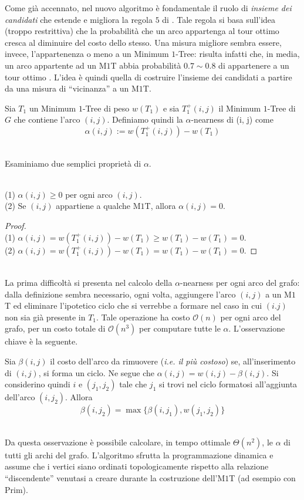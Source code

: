 Come già accennato, nel nuovo algoritmo è fondamentale il ruolo di \textit{insieme dei candidati} che 
estende e migliora la regola $5$ di \cite{LK}. Tale regola si basa sull'idea (troppo restrittiva) che la 
probabilità che un arco appartenga al tour ottimo cresca al diminuire del costo dello stesso. Una misura migliore 
sembra essere, invece, l'appartenenza o meno a un Minimum $1$-Tree: risulta infatti che, in media, un arco 
appartente ad un M$1$T abbia probabilità $0.7\sim0.8$ di appartenere a un tour ottimo \cite{LKH}. L'idea è quindi quella di 
costruire l'insieme dei candidati a partire da una misura di ``vicinanza'' a un M$1$T.

\begin{definition}
    Sia $T_1$ un Minimum $1$-Tree di peso $w(T_1)$ e sia $T_1^+(i, j)$ il Minimum $1$-Tree di $G$ che contiene 
    l'arco $(i, j)$. Definiamo quindi la $\alpha$-nearness di (i, j) come
    $$\alpha(i, j) := w(T_1^+(i,j)) - w(T_1)$$
\end{definition}
\ \\
Esaminiamo due semplici proprietà di $\alpha$.
\begin{theorem}\ \\
    (1) $\alpha(i,j) \geq 0$ per ogni arco $(i, j)$.\\
    (2) Se $(i, j)$ appartiene a qualche M$1$T, allora $\alpha(i,j)=0$.
\end{theorem}

\begin{proof}\ \\
    (1) $\alpha(i,j) = w(T_1^+(i,j))-w(T_1) \geq w(T_1)-w(T_1) = 0$.\\
    (2) $\alpha(i,j) = w(T_1^+(i,j))-w(T_1) = w(T_1)-w(T_1) = 0$.
\end{proof}
\ \\
La prima difficoltà si presenta nel calcolo della $\alpha$-nearness per ogni arco del grafo: dalla definizione 
sembra necessario, ogni volta, aggiungere l'arco $(i,j)$ a un M$1$T ed eliminare l'ipotetico ciclo che si 
verrebbe a formare nel caso in cui $(i.j)$ non sia già presente in $T_1$. Tale operazione ha costo $\mathcal{O}(n)$ 
per ogni arco del grafo, per un costo totale di $\mathcal{O}(n^3)$ per computare tutte le $\alpha$. L'osservazione 
chiave è la seguente.

\begin{observation}
    Sia $\beta(i,j)$ il costo dell'arco da rimuovere (\textit{i.e. il più costoso}) se, all'inserimento di $(i,j)$,
    si forma un ciclo. Ne segue che $\alpha(i,j)=w(i,j)-\beta(i,j)$. Si considerino quindi $i$ e $(j_1,j_2)$ 
    tale che $j_1$ si trovi nel ciclo formatosi all'aggiunta dell'arco $(i,j_2)$. Allora 
    $$\beta(i,j_2) = \max\{\beta(i,j_1), w(j_1,j_2)\}$$
\end{observation}
\ \\
Da questa osservazione è possibile calcolare, in tempo ottimale $\Theta(n^2)$, le $\alpha$ di tutti gli archi del 
grafo. L'algoritmo sfrutta la programmazione dinamica e assume che i vertici siano ordinati topologicamente rispetto 
alla relazione ``discendente'' venutasi a creare durante la costruzione dell'M$1$T (ad esempio con Prim).

